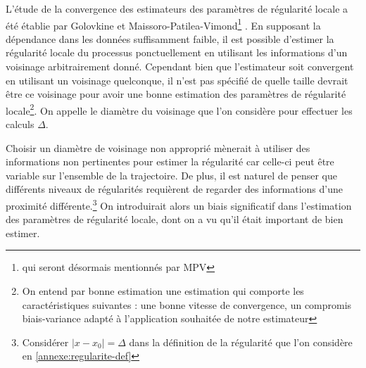 
L'étude de la convergence des estimateurs des paramètres de régularité locale a été établie par Golovkine et Maissoro-Patilea-Vimond\footnote{qui seront désormais mentionnés par \og MPV \fg} \cite{golovkineRegularityOnlineEstimationNoisyCurve,maissoro-SmoothnessFTSweakDep}. En supposant la dépendance dans les données suffisamment faible, il est possible d'estimer la régularité locale du processus ponctuellement en utilisant les informations d'un voisinage arbitrairement donné. Cependant bien que l'estimateur soit convergent en utilisant un voisinage quelconque, il n'est pas spécifié de quelle taille devrait être ce voisinage pour avoir une bonne estimation des paramètres de régularité locale\footnote{On entend par bonne estimation une estimation qui comporte les caractéristiques suivantes : une bonne vitesse de convergence, un compromis biais-variance adapté à l'application souhaitée de notre estimateur}. On appelle le diamètre du voisinage que l'on considère pour effectuer les calculs $\Delta$.


Choisir un diamètre de voisinage non approprié mènerait à utiliser des informations non pertinentes pour estimer la régularité car celle-ci peut être variable sur l'ensemble de la trajectoire. De plus, il est naturel de penser que différents niveaux de régularités requièrent de regarder des informations d'une proximité différente.\footnote{Considérer $|x-x_0| = \Delta$ dans la définition de la régularité que l'on considère en \ref{annexe:regularite-def} } On introduirait alors un biais significatif dans l'estimation des paramètres de régularité locale, dont on a vu qu'il était important de bien estimer.
